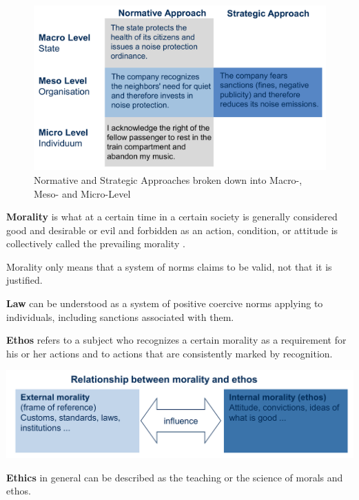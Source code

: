 \documentclass[11pt]{article}
\theoremstyle{definition}
\begin{document}
\begin{figure}[tbh]
	\centering
	\includegraphics[width=0.6\linewidth]{img/ethics_approach}
	\caption{Normative and Strategic Approaches broken down into Macro-, Meso- and Micro-Level}
	\label{fig:ethicsapproach}
\end{figure}

\begin{definition}
	\textbf{Morality} is what at a certain time in a certain society is generally considered good and desirable or evil and forbidden as an action, condition, or attitude is collectively called the prevailing morality \parencite{gobel2013unternehmensethik}.
	
	\vspace*{1em}
	\noindent
	Morality only means that a system of norms claims to be valid, not that it is justified.
\end{definition}

\begin{definition}
	\textbf{Law} can be understood as a system of positive coercive norms applying to individuals, including sanctions associated with them.
\end{definition}

\begin{definition}
	\textbf{Ethos} refers to a subject who recognizes a certain morality as a requirement for his or her actions and to actions that are consistently marked by recognition.
\end{definition}

\begin{center}
	\includegraphics[width=0.8\linewidth]{img/ethos}
\end{center}

\begin{definition}
	\textbf{Ethics} in general can be described as the teaching or the science of morals and ethos.
\end{definition}
\end{document}
